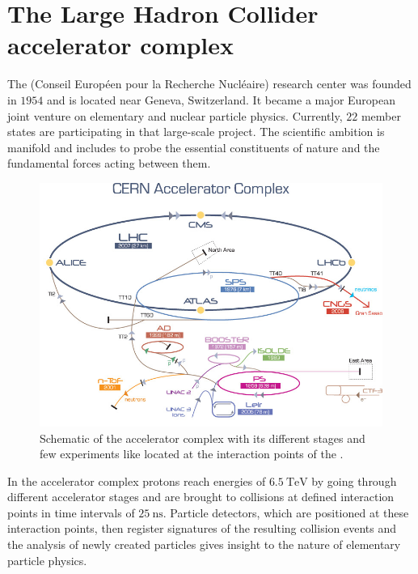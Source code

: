 \section{The Large Hadron Collider accelerator complex}\label{LHC}
The {\CERN} (Conseil Europ\'{e}en pour la Recherche Nucl\'{e}aire) research center was founded in $1954$ and is located near Geneva, Switzerland. It became a major European joint venture on elementary and nuclear particle physics. Currently, $22$ member states are participating in that large-scale project. The scientific ambition is manifold and includes to probe the essential constituents of nature and the fundamental forces acting between them. \cite{CERNabout}\par
%
\begin{figure}[htbp]                                 
 \begin{center}                                       
  \includegraphics[width=0.8\linewidth]{figures/CERNKomplex2.jpg} 
   \caption[Schematic of the {\CERN} accelerator complex.]{Schematic of the {\CERN} accelerator complex with its different stages and few experiments like {\ATLAS} located at the interaction points of the {\LHC}. \cite{CERNKomplex}}
  \label{complex}                                     
 \end{center}
\end{figure}
%
In the accelerator complex protons reach energies of $\SI{6.5}{\tera\electronvolt}$ by going through different accelerator stages and are brought to collisions at defined interaction points in time intervals of $\SI{25}{\nano\second}$. Particle detectors, which are positioned at these interaction points, then register signatures of the resulting collision events and the analysis of newly created particles gives insight to the nature of elementary particle physics.\cite{LHCJINST}\newline
